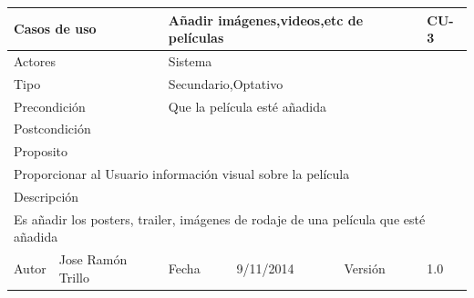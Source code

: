 \documentclass{article}
\begin{document}
\begin{table}[h]
\begin{tabular}{|l|l|l|l|l|l|}
\hline
\multicolumn{2}{|p{2cm}|}{Casos de uso}  & \multicolumn{3}{p{7cm}|}{\textbf{Añadir imágenes,videos,etc de películas}} & CU-3 \\
\hline
\multicolumn{2}{|p{2cm}|}{Actores}       & \multicolumn{4}{p{8cm}|}{Sistema}        \\
\hline
\multicolumn{2}{|p{2cm}|}{Tipo}          & \multicolumn{4}{p{8cm}|}{Secundario,Optativo}        \\
\hline
\multicolumn{2}{|p{2cm}|}{Precondición}  & \multicolumn{4}{p{8cm}|}{Que la película esté añadida}        \\
\hline
\multicolumn{2}{|p{2cm}|}{Postcondición} & \multicolumn{4}{p{8cm}|}{}        \\
\hline
\multicolumn{6}{|p{10cm}|}{Proposito}                                   \\
\hline
\multicolumn{6}{|p{10cm}|}{Proporcionar al Usuario información visual sobre la película }                                            \\
\hline
\multicolumn{6}{|p{10cm}|}{Descripción}                                 \\
\hline
\multicolumn{6}{|p{10cm}|}{Es añadir los posters, trailer, imágenes de rodaje de una película que esté añadida}                                            \\
\hline
Autor              &      Jose Ramón Trillo        & Fecha   & 9/11/2014     &   Versión  &1.0\\
\hline
\end{tabular}
\end{table}
\end{document}
